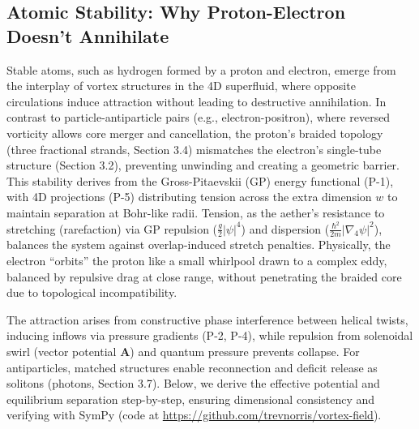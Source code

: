 
\subsection{Atomic Stability: Why Proton-Electron Doesn't Annihilate}

Stable atoms, such as hydrogen formed by a proton and electron, emerge from the interplay of vortex structures in the 4D superfluid, where opposite circulations induce attraction without leading to destructive annihilation. In contrast to particle-antiparticle pairs (e.g., electron-positron), where reversed vorticity allows core merger and cancellation, the proton's braided topology (three fractional strands, Section 3.4) mismatches the electron's single-tube structure (Section 3.2), preventing unwinding and creating a geometric barrier. This stability derives from the Gross-Pitaevskii (GP) energy functional (P-1), with 4D projections (P-5) distributing tension across the extra dimension $w$ to maintain separation at Bohr-like radii. Tension, as the aether's resistance to stretching (rarefaction) via GP repulsion ($\frac{g}{2} |\psi|^4$) and dispersion ($\frac{\hbar^2}{2m} |\nabla_4 \psi|^2$), balances the system against overlap-induced stretch penalties. Physically, the electron ``orbits'' the proton like a small whirlpool drawn to a complex eddy, balanced by repulsive drag at close range, without penetrating the braided core due to topological incompatibility.

The attraction arises from constructive phase interference between helical twists, inducing inflows via pressure gradients (P-2, P-4), while repulsion from solenoidal swirl (vector potential $\mathbf{A}$) and quantum pressure prevents collapse. For antiparticles, matched structures enable reconnection and deficit release as solitons (photons, Section 3.7). Below, we derive the effective potential and equilibrium separation step-by-step, ensuring dimensional consistency and verifying with SymPy (code at \url{https://github.com/trevnorris/vortex-field}).

